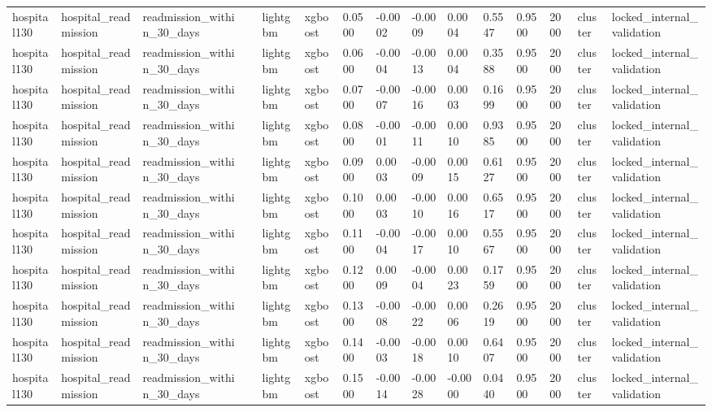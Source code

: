 \begin{tabular}{lllllllllllllll}
hospital130 & hospital\_readmission & readmission\_within\_30\_days &  & lightgbm & xgboost & 0.0500 & -0.0002 & -0.0009 & 0.0004 & 0.5547 & 0.9500 & 2000 & cluster & locked\_internal\_validation \\
hospital130 & hospital\_readmission & readmission\_within\_30\_days &  & lightgbm & xgboost & 0.0600 & -0.0004 & -0.0013 & 0.0004 & 0.3588 & 0.9500 & 2000 & cluster & locked\_internal\_validation \\
hospital130 & hospital\_readmission & readmission\_within\_30\_days &  & lightgbm & xgboost & 0.0700 & -0.0007 & -0.0016 & 0.0003 & 0.1699 & 0.9500 & 2000 & cluster & locked\_internal\_validation \\
hospital130 & hospital\_readmission & readmission\_within\_30\_days &  & lightgbm & xgboost & 0.0800 & -0.0001 & -0.0011 & 0.0010 & 0.9385 & 0.9500 & 2000 & cluster & locked\_internal\_validation \\
hospital130 & hospital\_readmission & readmission\_within\_30\_days &  & lightgbm & xgboost & 0.0900 & 0.0003 & -0.0009 & 0.0015 & 0.6127 & 0.9500 & 2000 & cluster & locked\_internal\_validation \\
hospital130 & hospital\_readmission & readmission\_within\_30\_days &  & lightgbm & xgboost & 0.1000 & 0.0003 & -0.0010 & 0.0016 & 0.6517 & 0.9500 & 2000 & cluster & locked\_internal\_validation \\
hospital130 & hospital\_readmission & readmission\_within\_30\_days &  & lightgbm & xgboost & 0.1100 & -0.0004 & -0.0017 & 0.0010 & 0.5567 & 0.9500 & 2000 & cluster & locked\_internal\_validation \\
hospital130 & hospital\_readmission & readmission\_within\_30\_days &  & lightgbm & xgboost & 0.1200 & 0.0009 & -0.0004 & 0.0023 & 0.1759 & 0.9500 & 2000 & cluster & locked\_internal\_validation \\
hospital130 & hospital\_readmission & readmission\_within\_30\_days &  & lightgbm & xgboost & 0.1300 & -0.0008 & -0.0022 & 0.0006 & 0.2619 & 0.9500 & 2000 & cluster & locked\_internal\_validation \\
hospital130 & hospital\_readmission & readmission\_within\_30\_days &  & lightgbm & xgboost & 0.1400 & -0.0003 & -0.0018 & 0.0010 & 0.6407 & 0.9500 & 2000 & cluster & locked\_internal\_validation \\
hospital130 & hospital\_readmission & readmission\_within\_30\_days &  & lightgbm & xgboost & 0.1500 & -0.0014 & -0.0028 & -0.0000 & 0.0440 & 0.9500 & 2000 & cluster & locked\_internal\_validation \\

\end{tabular}
